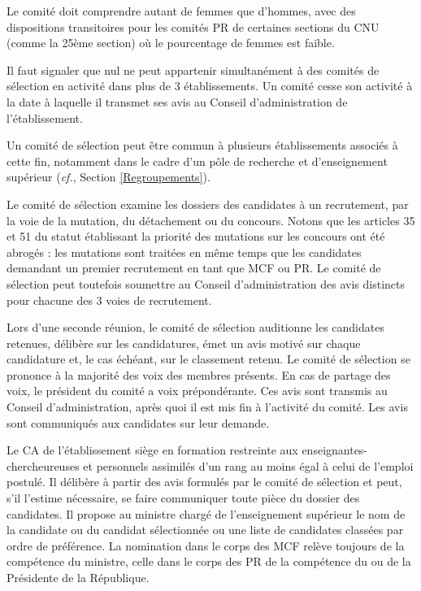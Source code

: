 Le comit\'e doit comprendre autant de femmes que d’hommes, avec des dispositions transitoires pour les comit\'es PR de certaines sections du CNU 
(comme la 25\`eme section) o\`u le pourcentage de femmes est faible.

Il faut signaler que nul ne peut appartenir simultan\'ement \`a des comit\'es de s\'election en activit\'e dans plus de 3
\'etablissements. Un comit\'e cesse son activit\'e \`a la date \`a laquelle il transmet ses avis au Conseil d'administration
de l'\'etablissement.

Un comit\'e de s\'election peut \^etre commun \`a plusieurs \'etablissements associ\'es \`a cette fin, notamment dans le
cadre d'un p\^ole de recherche et d'enseignement sup\'erieur ({\em cf.}, Section \ref{Regroupements}).

Le comit\'e de s\'election examine les dossiers des candidat\mp e\mp s \`a un recrutement, par la voie de la mutation, du
d\'etachement ou du concours. Notons que les articles 35 et 51 du statut \'etablissant la priorit\'e des mutations sur les concours ont \'et\'e abrog\'es : les mutations sont trait\'ees en m\^eme temps que les candidat\mp e\mp s demandant un premier recrutement en tant que MCF ou PR.
Le comit\'e de s\'election peut toutefois soumettre au Conseil d'administration des avis distincts pour chacune des 3 voies de recrutement.

Lors d'une seconde r\'eunion, le comit\'e de s\'election auditionne les candidat\mp e\mp s retenu\mp e\mp s, d\'elib\`ere sur les candidatures, \'emet un avis motiv\'e sur chaque candidature et, le cas \'ech\'eant, sur le classement retenu. Le comit\'e de s\'election se prononce \`a la majorit\'e des voix des membres pr\'esents. En cas de partage des voix, le pr\'esident du comit\'e a voix pr\'epond\'erante. Ces avis sont transmis au Conseil
d'administration, apr\`es quoi il est mis fin \`a l'activit\'e du comit\'e. Les avis sont communiqu\'es aux candidat\mp e\mp s sur leur demande. 

Le CA de l'\'etablissement si\`ege en formation
restreinte aux enseignant\mp e\mp s-chercheur\mp euse\mp s et personnels assimil\'es d'un rang au moins \'egal \`a celui de l'emploi
postul\'e. Il d\'elib\`ere \`a partir des avis formul\'es par le comit\'e de s\'election et peut, s'il l'estime n\'ecessaire, se faire communiquer toute pi\`ece du dossier des candidat\mp e\mp s. Il propose au ministre charg\'e de l'enseignement sup\'erieur le nom de la candidate ou du candidat s\'electionn\'e\mp e ou une liste de candidat\mp e\mp s class\'e\mp e\mp s par ordre de pr\'ef\'erence. La nomination dans le corps des MCF rel\`eve toujours de la comp\'etence du ministre, celle dans le corps des PR de la comp\'etence du ou de la Pr\'esident\mp e de la R\'epublique.

